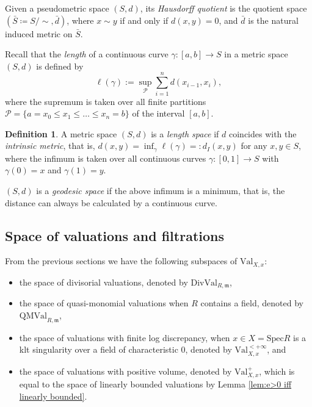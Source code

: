 \documentclass[11pt, leqno]{amsart}%
\theoremstyle{plain}
\theoremstyle{definition}
\newtheorem{definition}[theorem]{Definition}
\theoremstyle{remark}
\newcommand{\fm}{\mathfrak{m}}
\newcommand{\Val}{\mathrm{Val}}
\newcommand{\DivVal}{\mathrm{DivVal}}
\newcommand{\Spec}{\mathrm{Spec}}
\newcommand{\QMVal}{\mathrm{QMVal}}
\numberwithin{equation}{section}
\begin{document}
Given a pseudometric space $(S,d)$, its \emph{Hausdorff quotient} is the quotient space $(\bar S\coloneqq S/\sim,\bar d)$, where $x\sim y$ if and only if $d(x,y)=0$, and $\bar d$ is the natural induced metric on $\bar S$.

Recall that the \emph{length} of a continuous curve $\gamma:[a,b]\to S$ in a metric space $(S,d)$ is defined by
\[
    \ell(\gamma):=\sup_{\mathcal{P}}\sum_{i=1}^n d(x_{i-1},x_i),
\]
where the supremum is taken over all finite partitions $\mathcal{P}=\{a=x_0\le x_1\le\ldots\le x_n=b\}$ of the interval $[a,b]$.

\begin{definition}\label{defn:geodesic space}
    A metric space $(S,d)$ is a \emph{length space} if $d$ coincides with the \emph{intrinsic metric}, that is, $d(x,y)=\inf_\gamma \ell(\gamma)=:d_I(x,y)$ for any $x,y\in S$, where the infimum is taken over all continuous curves $\gamma:[0,1]\to S$ with $\gamma(0)=x$ and $\gamma(1)=y$.
	
    $(S,d)$ is a \emph{geodesic space} if the above infimum is a minimum, that is, the distance can always be calculated by a continuous curve.
\end{definition}




\subsection{Space of valuations and filtrations}\label{ssec:spaces}



From the previous sections we have the following subspaces of $\Val_{X,x}$:

\begin{itemize}
    \item the space of divisorial valuations, denoted by $\DivVal_{R,\fm}$,
	
    \item the space of quasi-monomial valuations when $R$ contains a field, denoted by $\QMVal_{R,\fm}$,
	
    \item the space of valuations with finite log discrepancy, when $x\in X=\Spec R$ is a klt singularity over a field of characteristic $0$, denoted by $\Val^{<+\infty}_{X,x}$, and
	
    \item the space of valuations with positive volume, denoted by $\Val^+_{X,x}$, which is equal to the space of linearly bounded valuations by Lemma \ref{lem:e>0 iff linearly bounded}.
	
\end{itemize}
\end{document}
